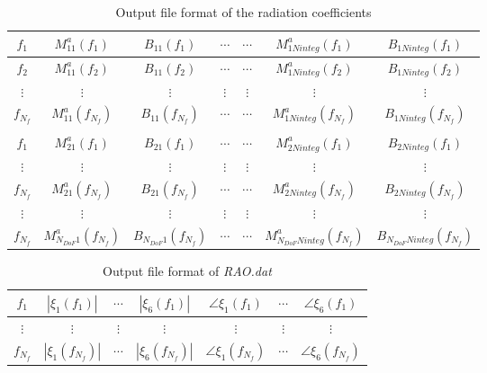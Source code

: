 \documentclass[12pt,a4paper,titlepage]{article}
\begin{document}
\begin{table}[ht]
\begin{center}
\caption{Output file format of the radiation coefficients}\label{tab:addedmass_damping_coeffs}
\begin{tabular}{ccccccc}
\hline
$f_1$ & $M^a_{11}(f_1)$ & $B_{11}(f_1)$ &$\cdots$ &$\cdots$&$ M^a_{1Ninteg}(f_1)$ & $B_{1Ninteg}(f_1)$ \\
\hline
$f_2$ & $M^a_{11}(f_2)$ & $B_{11}(f_2)$ &$\cdots$ &$\cdots$&$ M^a_{1Ninteg}(f_2)$ & $B_{1Ninteg}(f_2)$ \\
\hline
$\vdots$ & $\vdots$ & $\vdots$ & $\vdots$ & $\vdots$ & $\vdots$ & $\vdots$ \\
\hline
$f_{N_f}$ & $M^a_{11}(f_{N_f})$ & $B_{11}(f_{N_f})$ &$\cdots$ &$\cdots$&$ M^a_{1Ninteg}(f_{N_f})$ & $B_{1Ninteg}(f_{N_f})$ \\
\hline
& &  & & & & \\
\hline
$f_1$ & $M^a_{21}(f_1)$ & $B_{21}(f_1)$ &$\cdots$ &$\cdots$&$ M^a_{2Ninteg}(f_1)$ & $B_{2Ninteg}(f_1)$ \\
\hline
$\vdots$ & $\vdots$ & $\vdots$ & $\vdots$ & $\vdots$ & $\vdots$ & $\vdots$ \\
\hline
$f_{N_f}$ & $M^a_{21}(f_{N_f})$ & $B_{21}(f_{N_f})$ &$\cdots$ &$\cdots$&$ M^a_{2Ninteg}(f_{N_f})$ & $B_{2Ninteg}(f_{N_f})$ \\
\hline
$\vdots$ & $\vdots$ & $\vdots$ & $\vdots$ & $\vdots$ & $\vdots$ & $\vdots$ \\
\hline
$f_{N_f}$ & $M^a_{N_{DoF}1}(f_{N_f})$ & $B_{N_{DoF}1}(f_{N_f})$ &$\cdots$ &$\cdots$&$ M^a_{N_{DoF}Ninteg}(f_{N_f})$ & $B_{N_{DoF}Ninteg}(f_{N_f})$ \\
\hline
\end{tabular}
\end{center}
\end{table}

\begin{table}[ht]
\begin{center}
\caption{Output file format of \textit{RAO.dat}}\label{tab:RAO}
\begin{tabular}{ccccccc}
\hline
$f_1$ & $|\xi_1(f_1)|$ &$\cdots$ &$|\xi_6(f_1)|$ & $\angle \xi_1(f_1)$ &$\cdots$ &$\angle \xi_6(f_1)$ \\
\hline
$\vdots$& $\vdots$ & $\vdots$ & $\vdots$ &$\vdots$ &$\vdots$  &$\vdots$\\
\hline
$f_{N_f}$ & $|\xi_1(f_{N_f})|$ &$\cdots$ &$|\xi_6(f_{N_f})|$ & $\angle \xi_1(f_{N_f})$ &$\cdots$ &$\angle \xi_6(f_{N_f})$ \\
\hline
\end{tabular}
\end{center}
\end{table}
\end{document}

